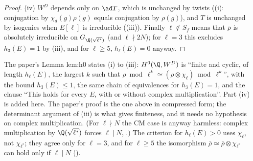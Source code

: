 \begin{proof}
(iv) $W^D$ depends only on $\ad T$, which is unchanged by twists ((i): conjugation by $\chi_d(g)\rho(g)$ equals conjugation by
$\rho(g)$), and $T$ is unchanged by isogenies when $E[\ell]$ is irreducible ((iii)). Finally $\ell\notin S_f$ means that $\bar\rho$ is
absolutely irreducible on $G_{\Q(\sqrt{\ell^*})}$ (and $\ell\nmid2N$); for $\ell=3$ this excludes $h_3(E)=1$ by (iii), and for $\ell\ge5$, $h_\ell(E)=0$ anyway.
\end{proof}

\begin{paperlink}
The paper's Lemma lem:h0 states (i) to (iii): $H^0(\Q,W^D)$ is ``finite and cyclic, of length $h_\ell(E)$, the largest $k$ such that
$\rho\bmod\ell^k\simeq(\rho\otimes\chi_\ell)\bmod\ell^k$'', with the bound $h_3(E)\le1$, the same chain of equivalences for $h_3(E)=1$, and the clause ``This holds for every
$E$, with or without complex multiplication''. Part (iv) is added here. The paper's proof is the one above in compressed form; the determinant argument
of (iii) is what gives finiteness, and it needs no hypothesis on complex multiplication. (For $\ell\nmid N$ the CM case is anyway harmless: complex
multiplication by $\Q(\sqrt{\ell^*})$ forces $\ell\mid N$, .) The criterion for $h_\ell(E)>0$ uses $\bar\chi_\ell$, not $\chi_{\ell^*}$; they agree
only for $\ell=3$, and for $\ell\ge5$ the isomorphism $\bar\rho\simeq\bar\rho\otimes\chi_{\ell^*}$ can hold only if $\ell\mid N$ ().
\end{paperlink}

